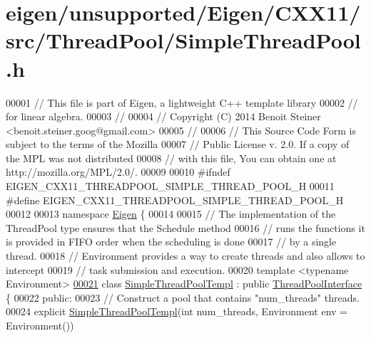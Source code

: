 \hypertarget{eigen_2unsupported_2_eigen_2_c_x_x11_2src_2_thread_pool_2_simple_thread_pool_8h_source}{}\section{eigen/unsupported/\+Eigen/\+C\+X\+X11/src/\+Thread\+Pool/\+Simple\+Thread\+Pool.h}
\label{eigen_2unsupported_2_eigen_2_c_x_x11_2src_2_thread_pool_2_simple_thread_pool_8h_source}

\begin{DoxyCode}
00001 \textcolor{comment}{// This file is part of Eigen, a lightweight C++ template library}
00002 \textcolor{comment}{// for linear algebra.}
00003 \textcolor{comment}{//}
00004 \textcolor{comment}{// Copyright (C) 2014 Benoit Steiner <benoit.steiner.goog@gmail.com>}
00005 \textcolor{comment}{//}
00006 \textcolor{comment}{// This Source Code Form is subject to the terms of the Mozilla}
00007 \textcolor{comment}{// Public License v. 2.0. If a copy of the MPL was not distributed}
00008 \textcolor{comment}{// with this file, You can obtain one at http://mozilla.org/MPL/2.0/.}
00009 
00010 \textcolor{preprocessor}{#ifndef EIGEN\_CXX11\_THREADPOOL\_SIMPLE\_THREAD\_POOL\_H}
00011 \textcolor{preprocessor}{#define EIGEN\_CXX11\_THREADPOOL\_SIMPLE\_THREAD\_POOL\_H}
00012 
00013 \textcolor{keyword}{namespace }\hyperlink{namespace_eigen}{Eigen} \{
00014 
00015 \textcolor{comment}{// The implementation of the ThreadPool type ensures that the Schedule method}
00016 \textcolor{comment}{// runs the functions it is provided in FIFO order when the scheduling is done}
00017 \textcolor{comment}{// by a single thread.}
00018 \textcolor{comment}{// Environment provides a way to create threads and also allows to intercept}
00019 \textcolor{comment}{// task submission and execution.}
00020 \textcolor{keyword}{template} <\textcolor{keyword}{typename} Environment>
\hyperlink{class_eigen_1_1_simple_thread_pool_templ}{00021} \textcolor{keyword}{class }\hyperlink{class_eigen_1_1_simple_thread_pool_templ}{SimpleThreadPoolTempl} : \textcolor{keyword}{public} \hyperlink{class_eigen_1_1_thread_pool_interface}{ThreadPoolInterface} \{
00022  \textcolor{keyword}{public}:
00023   \textcolor{comment}{// Construct a pool that contains "num\_threads" threads.}
00024   \textcolor{keyword}{explicit} \hyperlink{class_eigen_1_1_simple_thread_pool_templ}{SimpleThreadPoolTempl}(\textcolor{keywordtype}{int} num\_threads, Environment env = Environment())

\end{DoxyCode}
